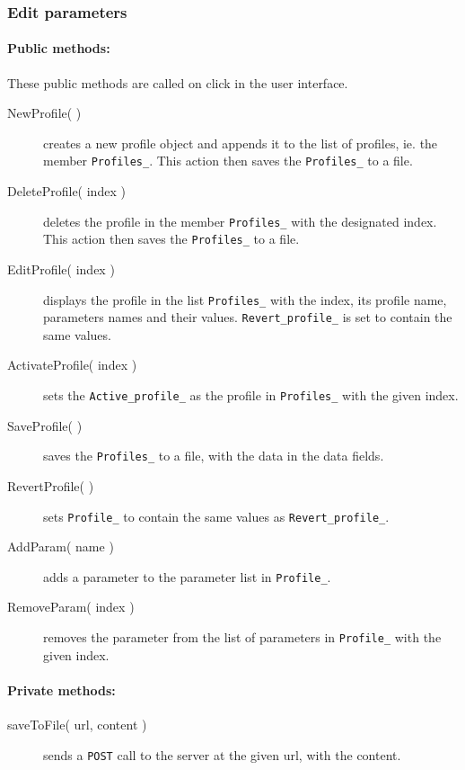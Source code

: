 \subsubsection{Edit parameters}

\paragraph{Public methods:}
These public methods are called on click in the user interface.
\begin{adjustwidth}{2.5em}{0pt}\begin{description}
	\item[NewProfile( )] creates a new profile object and appends it to the list of profiles, ie. the member \texttt{Profiles_}. This action then saves the \texttt{Profiles_} to a file.
	\item[DeleteProfile( index )] deletes the profile in the member \texttt{Profiles_} with the designated index. This action then saves the \texttt{Profiles_} to a file.
	\item[EditProfile( index )] displays the profile in the list \texttt{Profiles_} with the index, its profile name, parameters names and their values. \texttt{Revert_profile_} is set to contain the same values.
	\item[ActivateProfile( index )] sets the \texttt{Active_profile_} as the profile in \texttt{Profiles_} with the given index.
	\item[SaveProfile( )]  saves the \texttt{Profiles_} to a file, with the data in the data fields.
	\item[RevertProfile( )] sets \texttt{Profile_} to contain the same values as \texttt{Revert_profile_}.
	\item[AddParam( name )] adds a parameter to the parameter list in \texttt{Profile_}.
	\item[RemoveParam( index )] removes the parameter from the list of parameters in \texttt{Profile_} with the given index.
\end{description}\end{adjustwidth}


\paragraph{Private methods:}
\begin{adjustwidth}{2.5em}{0pt}\begin{description}
	\item[saveToFile( url, content )] sends a \texttt{POST} call to the server at the given url, with the content.
\end{description}\end{adjustwidth}

